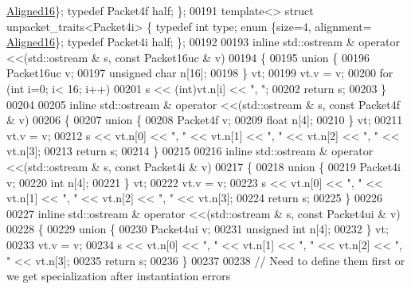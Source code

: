 \begin{DoxyCode}
{      \hyperlink{group__enums_gga45fe06e29902b7a2773de05ba27b47a1af8e2bf74b04c02199f62c5e3c06dbfcc}{Aligned16}\}; \textcolor{keyword}{typedef} Packet4f half; \};
00191 \textcolor{keyword}{template}<> \textcolor{keyword}{struct }unpacket\_traits<Packet4i> \{ \textcolor{keyword}{typedef} \textcolor{keywordtype}{int}    type; \textcolor{keyword}{enum} \{size=4, alignment=
      \hyperlink{group__enums_gga45fe06e29902b7a2773de05ba27b47a1af8e2bf74b04c02199f62c5e3c06dbfcc}{Aligned16}\}; \textcolor{keyword}{typedef} Packet4i half; \};
00192 
00193 \textcolor{keyword}{inline} std::ostream & operator <<(std::ostream & s, \textcolor{keyword}{const} Packet16uc & v)
00194 \{
00195   \textcolor{keyword}{union }\{
00196     Packet16uc   v;
00197     \textcolor{keywordtype}{unsigned} \textcolor{keywordtype}{char} n[16];
00198   \} vt;
00199   vt.v = v;
00200   \textcolor{keywordflow}{for} (\textcolor{keywordtype}{int} i=0; i< 16; i++)
00201     s << (\textcolor{keywordtype}{int})vt.n[i] << \textcolor{stringliteral}{", "};
00202   \textcolor{keywordflow}{return} s;
00203 \}
00204 
00205 \textcolor{keyword}{inline} std::ostream & operator <<(std::ostream & s, \textcolor{keyword}{const} Packet4f & v)
00206 \{
00207   \textcolor{keyword}{union }\{
00208     Packet4f   v;
00209     \textcolor{keywordtype}{float} n[4];
00210   \} vt;
00211   vt.v = v;
00212   s << vt.n[0] << \textcolor{stringliteral}{", "} << vt.n[1] << \textcolor{stringliteral}{", "} << vt.n[2] << \textcolor{stringliteral}{", "} << vt.n[3];
00213   \textcolor{keywordflow}{return} s;
00214 \}
00215 
00216 \textcolor{keyword}{inline} std::ostream & operator <<(std::ostream & s, \textcolor{keyword}{const} Packet4i & v)
00217 \{
00218   \textcolor{keyword}{union }\{
00219     Packet4i   v;
00220     \textcolor{keywordtype}{int} n[4];
00221   \} vt;
00222   vt.v = v;
00223   s << vt.n[0] << \textcolor{stringliteral}{", "} << vt.n[1] << \textcolor{stringliteral}{", "} << vt.n[2] << \textcolor{stringliteral}{", "} << vt.n[3];
00224   \textcolor{keywordflow}{return} s;
00225 \}
00226 
00227 \textcolor{keyword}{inline} std::ostream & operator <<(std::ostream & s, \textcolor{keyword}{const} Packet4ui & v)
00228 \{
00229   \textcolor{keyword}{union }\{
00230     Packet4ui   v;
00231     \textcolor{keywordtype}{unsigned} \textcolor{keywordtype}{int} n[4];
00232   \} vt;
00233   vt.v = v;
00234   s << vt.n[0] << \textcolor{stringliteral}{", "} << vt.n[1] << \textcolor{stringliteral}{", "} << vt.n[2] << \textcolor{stringliteral}{", "} << vt.n[3];
00235   \textcolor{keywordflow}{return} s;
00236 \}
00237 
00238 \textcolor{comment}{// Need to define them first or we get specialization after instantiation errors}
}
\end{DoxyCode}
